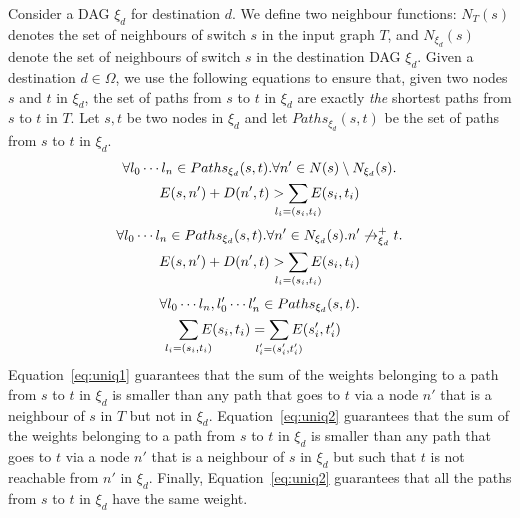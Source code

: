 Consider a DAG $\xi_d$ for destination $d$. We define two neighbour
functions: $N_T(s)$ denotes the set of neighbours of switch $s$ 
in the input graph $T$, and $N_{\xi_d}(s)$ denote the set of
neighbours of switch $s$ in the destination DAG $\xi_d$. 
Given a destination $d\in \Omega$,
we use the following equations to ensure that, given two nodes $s$ and $t$ in
$\xi_d$, 
the set of paths from $s$ to $t$ in $\xi_d$ are
exactly
\emph{the} shortest paths from $s$ to $t$ in $T$.
Let $s,t$ be two nodes in $\xi_d$ and let  $Paths_{\xi_d}(s,t)$ be the set of paths from $s$ to $t$ in $\xi_d$.
\begin{multline} \label{eq:uniq1}
		\forall l_0\cdots l_n\in Paths_{\xi_d}(s,t).
		\forall n' \in N(s) \setminus N_{\xi_d}(s). \\
		E(s, n') + D(n', t) > \sum_{\mathclap{\substack{l_i=(s_i,t_i)}}} 
		E(s_i, t_i) 
\end{multline}
\begin{multline} \label{eq:uniq2}
		\forall l_0\cdots l_n\in Paths_{\xi_d}(s,t).
		\forall n' \in N_{\xi_d}(s). n' \not\rightarrow^+_{\xi_d} t.  \\
		E(s, n') + D(n', t) > \sum_{\mathclap{\substack{l_i=(s_i,t_i)}}} 
		E(s_i, t_i) 
\end{multline}
\begin{multline} \label{eq:uniq3}
		\forall l_0\cdots l_n, l_0'\cdots l_n'\in Paths_{\xi_d}(s,t).\\
		\sum_{\mathclap{\substack{l_i=(s_i,t_i)}}} 
		E(s_i, t_i)  =\sum_{\mathclap{\substack{l_i'=(s_i',t_i')}}} 
		E(s_i', t_i') 
\end{multline}
Equation~\ref{eq:uniq1} guarantees that 
the sum of the weights belonging to a path from $s$ to $t$ in $\xi_d$ is smaller than 
any path that goes to $t$ via a node $n'$ that is a neighbour of $s$ in $T$ but not in $\xi_d$.
Equation~\ref{eq:uniq2} guarantees that
the sum of the weights belonging to a path from $s$ to $t$ in $\xi_d$ is smaller than 
any path that goes to $t$ via a node $n'$ that is a neighbour of $s$ in $\xi_d$ but such that
$t$ is not reachable from $n'$ in $\xi_d$.
Finally, Equation~\ref{eq:uniq2} guarantees that all the paths from $s$ to $t$ in $\xi_d$ have the same weight.


